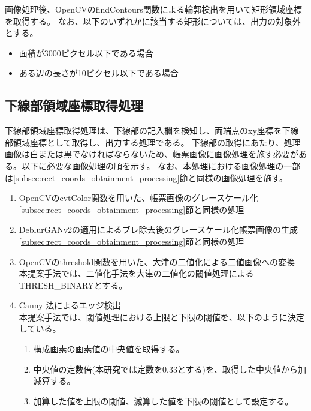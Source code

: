 画像処理後、OpenCVのfindContours関数による輪郭検出を用いて矩形領域座標を取得する。
なお、以下のいずれかに該当する矩形については、出力の対象外とする。

\begin{itemize}
    \item 面積が3000ピクセル以下である場合
    \item ある辺の長さが10ピクセル以下である場合
\end{itemize}


\subsection{下線部領域座標取得処理}\label{subsec:underline_coords_obtainment_processing}
下線部領域座標取得処理は、下線部の記入欄を検知し、両端点のxy座標を下線部領域座標として取得し、出力する処理である。
下線部の取得にあたり、処理画像は白または黒でなければならないため、帳票画像に画像処理を施す必要がある。以下に必要な画像処理の順を示す。
なお、本処理における画像処理の一部は\ref{subsec:rect_coords_obtainment_processing}節と同様の画像処理を施す。

\begin{enumerate}
    \item OpenCVのcvtColor関数を用いた、帳票画像のグレースケール化\\
        \ref{subsec:rect_coords_obtainment_processing}節と同様の処理
    \item DeblurGANv2の適用によるブレ除去後のグレースケール化帳票画像の生成\\
        \ref{subsec:rect_coords_obtainment_processing}節と同様の処理
    \item OpenCVのthreshold関数を用いた、大津の二値化による二値画像への変換\\
        本提案手法では、二値化手法を大津の二値化の閾値処理によるTHRESH\_BINARYとする。
    \item Canny 法によるエッジ検出\\
        本提案手法では、閾値処理における上限と下限の閾値を、以下のように決定している。
        \begin{enumerate}
            \item 構成画素の画素値の中央値を取得する。
            \item 中央値の定数倍(本研究では定数を0.33とする)を、取得した中央値から加減算する。
            \item 加算した値を上限の閾値、減算した値を下限の閾値として設定する。
        \end{enumerate}
\end{enumerate}

